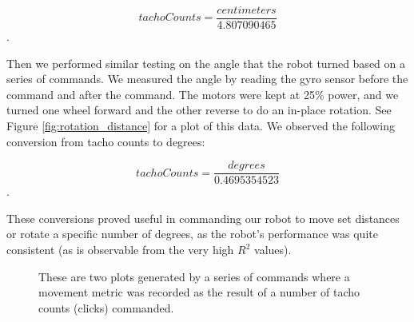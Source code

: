 \documentclass[12pt]{article}
\begin{document}
\[tachoCounts=\frac{centimeters}{4.807090465}\].

Then we performed similar testing on the angle that the robot turned based on a series of commands. We measured the angle by reading the gyro sensor before the command and after the command. The motors were kept at 25\% power, and we turned one wheel forward and the other reverse to do an in-place rotation. See Figure \ref{fig:rotation_distance} for a plot of this data. We observed the following conversion from tacho counts to degrees:

\[tachoCounts=\frac{degrees}{0.4695354523}\].

These conversions proved useful in commanding our robot to move set distances or rotate a specific number of degrees, as the robot's performance was quite consistent (as is observable from the very high $R^2$ values).

\begin{figure}
	\hfill

	\label{fig:distance_testing}
	\caption{These are two plots generated by a series of commands where a movement metric was recorded as the result of a number of tacho counts (clicks) commanded.}

\end{figure}
\end{document}

